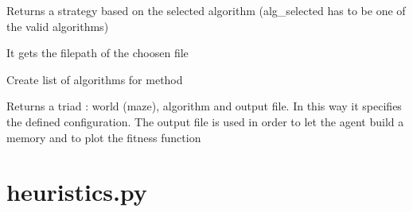 \documentclass[letterpaper,10pt,english]{sphinxmanual}
\begin{document}
\begin{fulllineitems}
\label{\detokenize{index:cli.get_algorithm}}
Returns a strategy based on the selected algorithm
(alg\_selected has to be one of the valid algorithms)

\end{fulllineitems}


\begin{fulllineitems}
\label{\detokenize{index:cli.build_maze_filepath}}
It gets the filepath of the choosen  file

\end{fulllineitems}


\begin{fulllineitems}
\label{\detokenize{index:cli.algorithms_list}}
Create list of algorithms for  method

\end{fulllineitems}


\begin{fulllineitems}
\label{\detokenize{index:cli.parse_args}}
Returns a triad : world (maze), algorithm and output file.
In this way it specifies the defined configuration.
The output file is used in order to let the agent build a memory and
to plot the fitness function

\end{fulllineitems}

\label{\detokenize{index:module-heuristics}}

\chapter{heuristics.py}
\label{\detokenize{index:heuristics-py}}
\end{document}

